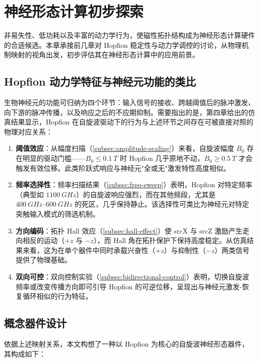 \chapter{神经形态计算初步探索}

非易失性、低功耗以及丰富的动力学行为，使磁性拓扑结构成为神经形态计算硬件的合适候选。本章承接前几章对 Hopfion 稳定性与动力学调控的讨论，从物理机制映射的视角出发，初步评估其在神经形态计算中的应用前景。


\section{Hopfion 动力学特征与神经元功能的类比}

生物神经元的功能可归纳为四个环节：输入信号的接收、跨越阈值后的脉冲激发、向下游的脉冲传播，以及响应之后的不应期抑制。需要指出的是，第四章给出的仿真结果显示，Hopfion 在自旋波驱动下的行为与上述环节之间存在可被直接对照的物理对应关系：

\begin{enumerate}
  \item \textbf{阈值效应}：从幅度扫描（\cref{subsec:amplitude-scaling}）来看，自旋波幅度 $B_0$ 存在明显的驱动门槛——$B_0 \leq \SI{0.1}{T}$ 时 Hopfion 几乎原地不动，$B_0 \geq \SI{0.5}{T}$ 才会触发有效位移。此类阶跃式响应与神经元"全或无"激发特性高度相似。
  \item \textbf{频率选择性}：频率扫描结果（\cref{subsec:freq-sweep}）表明，Hopfion 对特定频率（典型如 $\SI{1100}{GHz}$）的自旋波响应强烈，而在其他频段，尤其是 $\SIrange{400}{600}{GHz}$ 的死区，几乎保持静止。该选择性可类比为神经元对特定突触输入模式的筛选机制。
  \item \textbf{方向编码}：拓扑 Hall 效应（\cref{subsec:hall-effect}）使 srcX 与 srcZ 激励产生走向相反的运动（$+z$ 与 $-z$），而 Hall 角在拓扑保护下保持高度稳定。从仿真结果来看，这为在单个器件中同时承载兴奋性（$+z$）与抑制性（$-z$）两类信号提供了物理基础。
  \item \textbf{双向可控}：双向控制实验（\cref{subsec:bidirectional-control}）表明，切换自旋波频率或改变传播方向即可引导 Hopfion 的可逆位移，呈现出与神经元激发-恢复循环相似的行为特征。
\end{enumerate}


\section{概念器件设计}

依据上述映射关系，本文构想了一种以 Hopfion 为核心的自旋波神经形态器件，其构成如下：

